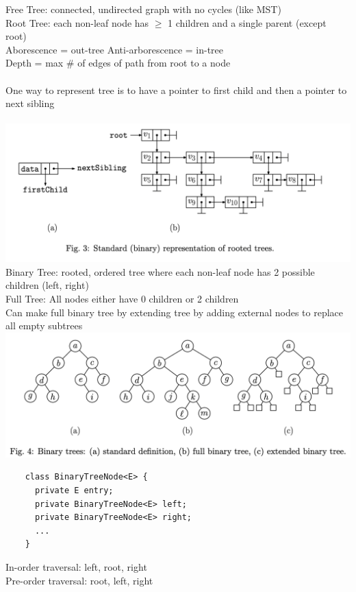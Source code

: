 \documentclass{article}
\begin{document}
  Free Tree: connected, undirected graph with no cycles (like MST)\\
  Root Tree: each non-leaf node has $\geq$ 1 children and a single parent (except root)\\
  \indent Aborescence = out-tree \quad Anti-arborescence = in-tree \\
  \indent Depth = max \# of edges of path from root to a node \\ \\
  One way to represent tree is to have a pointer to first child and then a pointer to next sibling \\ \\
  \includegraphics[width=\textwidth]{Fig_3}
  Binary Tree: rooted, ordered tree where each non-leaf node has 2 possible children (left, right) \\ 
  \indent Full Tree: All nodes either have 0 children or 2 children \\
  \indent Can make full binary tree by extending tree by adding external nodes to replace all empty subtrees\\
  \includegraphics[width=\textwidth]{Fig_4}
  \begin{lstlisting}
    class BinaryTreeNode<E> {
      private E entry;
      private BinaryTreeNode<E> left;
      private BinaryTreeNode<E> right;
      ...
    }
  \end{lstlisting}
  In-order traversal: left, root, right \\
  Pre-order traversal: root, left, right \\ 
\end{document}
